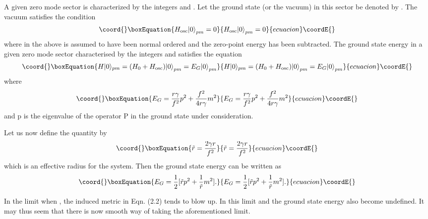 \documentclass[a4paper,12pt]{article}
\begin{document}
A given zero mode sector is characterized by the integers
\coordHE{} and \coordHE{}. Let the ground state (or the vacuum) in this sector 
be denoted by \coordHE{}. The vacuum satisfies the
condition
\begin{equation}\coord{}\boxEquation{
H_{\rm osc}|0{\rangle}_{pm} = 0
}{
H_{\rm osc}|0{\rangle}_{pm} = 0
}{ecuacion}\coordE{}\end{equation}
where in the above \coordHE{} is assumed to have been normal ordered and
the zero-point energy has been subtracted. 
The ground state energy in a given zero mode sector 
characterised by the integers \coordHE{} and \coordHE{} satisfies the equation
\begin{equation}\coord{}\boxEquation{
H|0 \rangle_{pm}= (H_0 + H_{\rm osc})|0 {\rangle}_{pm} 
= E_G|0 {\rangle}_{pm}
}{
H|0 \rangle_{pm}= (H_0 + H_{\rm osc})|0 {\rangle}_{pm} 
= E_G|0 {\rangle}_{pm}
}{ecuacion}\coordE{}\end{equation}
where
\begin{equation}\coord{}\boxEquation{
E_G=\frac{r{\gamma}}{f^2} p^2 + \frac{f^2}{4r{\gamma}}m^2
}{
E_G=\frac{r{\gamma}}{f^2} p^2 + \frac{f^2}{4r{\gamma}}m^2
}{ecuacion}\coordE{}\end{equation}
and  p is the eigenvalue of the operator P in the ground state under
consideration.

Let us now define the quantity \coordHE{} by
\begin{equation}\coord{}\boxEquation{
{\tilde r}=\frac{2{\gamma}r}{f^2}
}{
{\tilde r}=\frac{2{\gamma}r}{f^2}
}{ecuacion}\coordE{}\end{equation}
which is an effective radius for the system.
Then the ground state energy can be written as
\begin{equation}\coord{}\boxEquation{
E_G=\frac{1}{2}[{\tilde r}p^2 + \frac{1}{{\tilde r}}m^2].
}{
E_G=\frac{1}{2}[{\tilde r}p^2 + \frac{1}{{\tilde r}}m^2].
}{ecuacion}\coordE{}\end{equation}

In  the limit when \coordHE{}, the induced metric \coordHE{} in
Eqn. (2.2)
tends to blow up. In this limit \coordHE{} and the ground state
energy \coordHE{} also become undefined. It may thus seem that there is now
smooth way of taking the aforementioned limit. 
\end{document}
